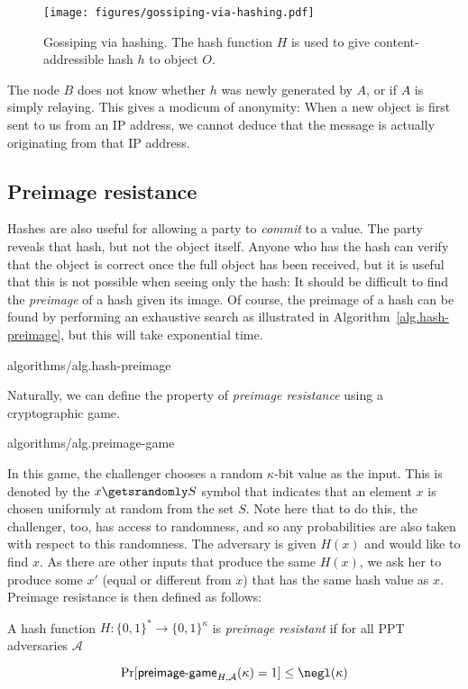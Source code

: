 \begin{figure}
    \centering
    \texttt{[image: figures/gossiping-via-hashing.pdf]}
    \caption{Gossiping via hashing. The hash function $H$ is used to give content-addressible hash $h$ to object $O$.}
    \label{fig.gossiping-via-hashing}
\end{figure}

The node $B$ does not know whether $h$ was newly generated by $A$, or if $A$ is simply relaying.
This gives a modicum of anonymity: When a new object is first sent to us from an IP address,
we cannot deduce that the message is actually originating from that IP address.

\subsection*{Preimage resistance}

Hashes are also useful for allowing a party to \emph{commit} to a value. The party
reveals that hash, but not the object itself. Anyone who has the hash can verify that
the object is correct once the full object has been received, but it is useful that
this is not possible when seeing only the hash: It should be difficult to find the
\emph{preimage} of a hash given its image. Of course, the preimage of a hash can
be found by performing an exhaustive search as illustrated in Algorithm~\ref{alg.hash-preimage},
but this will take exponential time.

{algorithms/alg.hash-preimage}

Naturally, we can define the property of \emph{preimage resistance} using a
cryptographic game.

{algorithms/alg.preimage-game}

In this game, the challenger chooses a random $\kappa$-bit value as the input. This is denoted by
the $x \getsrandomly S$ symbol that indicates that an element $x$ is chosen uniformly at random
from the set $S$. Note here that to do this, the challenger, too, has access to randomness,
and so any probabilities are also taken with respect to this randomness.
The adversary is given $H(x)$ and would like to find $x$.
As there are other inputs that produce the same $H(x)$,
we ask her to produce some $x'$ (equal or different from $x$) that has the same hash value
as $x$. Preimage resistance is then defined as follows:

\begin{definition}
  A hash function $H: \{0, 1\}^* \longrightarrow \{0, 1\}^\kappa$ is \emph{preimage resistant}
  if for all PPT adversaries $\mathcal{A}$

  \[
    \Pr[\textsf{preimage-game}_{H,\mathcal{A}}(\kappa) = 1] \leq \negl(\kappa)
  \]
\end{definition}

